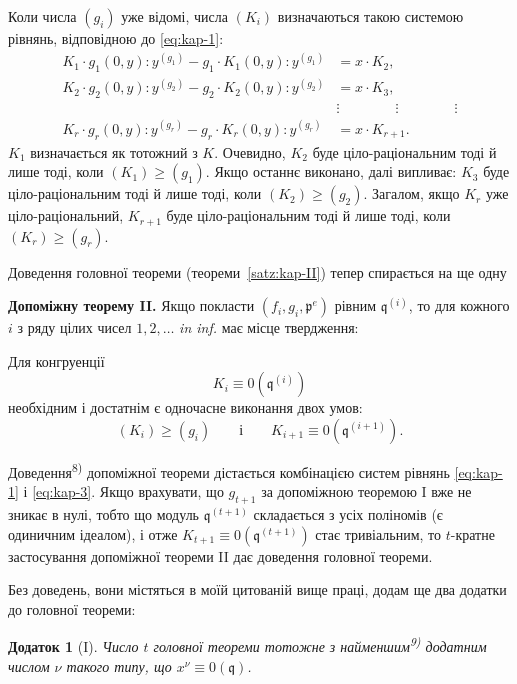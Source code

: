 \documentclass[11pt]{article}
\theoremstyle{plain}
\newtheorem{zusatz}{Додаток}
\begin{document}
Коли числа $(g_{i})$ уже відомі, числа $(K_{i})$ визначаються такою
системою рівнянь, відповідною до \eqref{eq:kap-1}:
\begin{equation}\label{eq:kap-3}
\begin{aligned}
K_{1} \cdot g_{1}(0,y):y^{(g_{1})} - g_{1} \cdot K_{1}(0,y):y^{(g_{1})} &= x \cdot K_{2},\\
K_{2} \cdot g_{2}(0,y):y^{(g_{2})} - g_{2} \cdot K_{2}(0,y):y^{(g_{2})} &= x \cdot K_{3},\\
&\vdots \qquad\qquad\vdots\qquad\qquad\vdots\\
K_{r} \cdot g_{r}(0,y):y^{(g_{r})} - g_{r} \cdot K_{r}(0,y):y^{(g_{r})} &= x \cdot K_{r+1}.
\end{aligned}
\end{equation}
$K_{1}$ визначається як тотожний з $K$. Очевидно, $K_{2}$ буде
ціло-раціональним тоді й лише тоді, коли $(K_{1}) \geq (g_{1})$.
Якщо останнє виконано, далі випливає: $K_{3}$ буде
ціло-раціональним тоді й лише тоді, коли $(K_{2}) \geq (g_{2})$.
Загалом, якщо $K_{r}$ уже ціло-раціональний, $K_{r+1}$ буде
ціло-раціональним тоді й лише тоді, коли $(K_{r}) \geq (g_{r})$.

Доведення головної теореми (теореми~\ref{satz:kap-II}) тепер
спирається на ще одну

\smallskip
\textbf{Допоміжну теорему II.} Якщо покласти
$(f_{i}, g_{i}, \mathfrak{p}^{e})$ рівним $\mathfrak{q}^{(i)}$, то для
кожного $i$ з ряду цілих чисел $1, 2, \ldots$ \textit{in inf.} має
місце твердження:

Для конгруенції
\[
K_{i} \equiv 0(\mathfrak{q}^{(i)})
\]
необхідним і достатнім є одночасне виконання двох умов:
\[
(K_{i}) \geq (g_{i}) \qquad \text{і} \qquad
K_{i+1} \equiv 0(\mathfrak{q}^{(i+1)}).
\]

Доведення\textsuperscript{8)} допоміжної теореми дістається
комбінацією систем рівнянь \eqref{eq:kap-1} і \eqref{eq:kap-3}. Якщо
врахувати, що $g_{t+1}$ за допоміжною теоремою I вже не зникає в
нулі, тобто що модуль $\mathfrak{q}^{(t+1)}$ складається з усіх
поліномів (є одиничним ідеалом), і отже
$K_{t+1} \equiv 0(\mathfrak{q}^{(t+1)})$ стає тривіальним, то
$t$-кратне застосування допоміжної теореми II дає доведення
головної теореми.

\smallskip
Без доведень, вони містяться в моїй цитованій вище праці, додам ще
два додатки до головної теореми:

\begin{zusatz}[I]
Число $t$ головної теореми тотожне з найменшим\textsuperscript{9)}
додатним числом $\nu$ такого типу, що $x^{\nu} \equiv 0(\mathfrak{q})$.
\end{zusatz}
\end{document}
